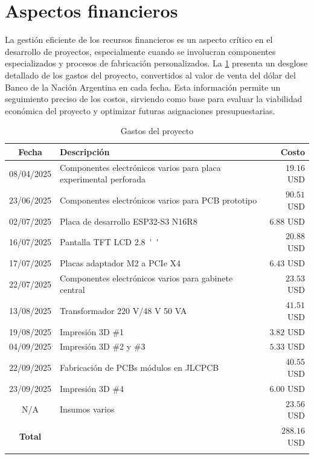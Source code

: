 \section{Aspectos financieros}
\justifying

La gestión eficiente de los recursos financieros es un aspecto crítico en el desarrollo de proyectos, especialmente cuando se involucran componentes especializados y procesos de fabricación personalizados. La \cref{tab:aspectos_financieros:gastos} presenta un desglose detallado de los gastos del proyecto, convertidos al valor de venta del dólar del Banco de la Nación Argentina en cada fecha. Esta información permite un seguimiento preciso de los costos, sirviendo como base para evaluar la viabilidad económica del proyecto y optimizar futuras asignaciones presupuestarias.

\begin{table}[H]
\centering
\caption{Gastos del proyecto}
\begin{tabularx}{\linewidth}{cXr}
\hline
\textbf{Fecha} & \textbf{Descripción}                                                   & \textbf{Costo}   \\ \hline
08/04/2025     & Componentes electrónicos varios para placa experimental perforada      & $19.16$ USD      \\
23/06/2025     & Componentes electrónicos varios para PCB prototipo                     & $90.51$ USD      \\
02/07/2025     & Placa de desarrollo ESP32-S3 N16R8                                     & $6.88$ USD       \\
16/07/2025     & Pantalla TFT LCD \SI{2.8}{''}                                          & $20.88$ USD      \\
17/07/2025     & Placas adaptador M2 a PCIe X4                                          & $6.43$ USD       \\
22/07/2025     & Componentes electrónicos varios para gabinete central                  & $23.53$ USD      \\
13/08/2025     & Transformador 220 V/48 V 50 VA                                         & $41.51$ USD      \\
19/08/2025     & Impresión 3D \#1                                                       & $3.82$ USD       \\
04/09/2025     & Impresión 3D \#2 y \#3                                                 & $5.33$ USD       \\
22/09/2025     & Fabricación de PCBs módulos en JLCPCB                                  & $40.55$ USD      \\
23/09/2025     & Impresión 3D \#4                                                       & $6.00$ USD       \\
N/A            & Insumos varios                                                         & $23.56$ USD      \\ \hline
\textbf{Total} &                                                                        & $288.16$ USD     \\ \hline

\label{tab:aspectos_financieros:gastos}
\end{tabularx}
\end{table}